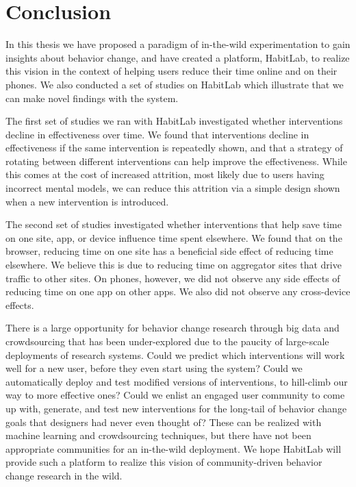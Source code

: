 \chapter{Conclusion}

In this thesis we have proposed a paradigm of in-the-wild experimentation to gain insights about behavior change, and have created a platform, HabitLab, to realize this vision in the context of helping users reduce their time online and on their phones. We also conducted a set of studies on HabitLab which illustrate that we can make novel findings with the system.

The first set of studies we ran with HabitLab investigated whether interventions decline in effectiveness over time. We found that interventions decline in effectiveness if the same intervention is repeatedly shown, and that a strategy of rotating between different interventions can help improve the effectiveness. While this comes at the cost of increased attrition, most likely due to users having incorrect mental models, we can reduce this attrition via a simple design shown when a new intervention is introduced.

The second set of studies investigated whether interventions that help save time on one site, app, or device influence time spent elsewhere. We found that on the browser, reducing time on one site has a beneficial side effect of reducing time elsewhere. We believe this is due to reducing time on aggregator sites that drive traffic to other sites. On phones, however, we did not observe any side effects of reducing time on one app on other apps. We also did not observe any cross-device effects.

There is a large opportunity for behavior change research through big data and crowdsourcing that has been under-explored due to the paucity of large-scale deployments of research systems. Could we predict which interventions will work well for a new user, before they even start using the system? Could we automatically deploy and test modified versions of interventions, to hill-climb our way to more effective ones? Could we enlist an engaged user community to come up with, generate, and test new interventions for the long-tail of behavior change goals that designers had never even thought of? These can be realized with machine learning and crowdsourcing techniques, but there have not been appropriate communities for an in-the-wild deployment. We hope HabitLab will provide such a platform to realize this vision of community-driven behavior change research  in the wild. %
